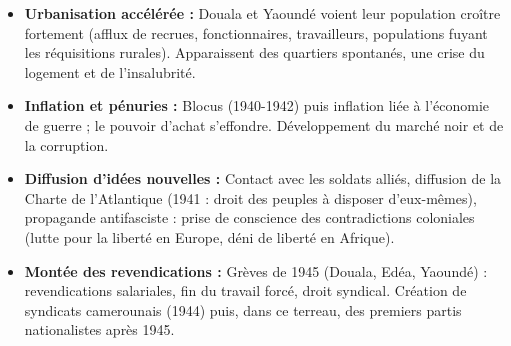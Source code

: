 \documentclass[11pt]{article}
\newcommand{\cle}[1]{{\popxbold\color{popdark}#1}}
\begin{document}
\begin{propriete}
\begin{itemize}
    \item \textbf{Urbanisation accélérée :} Douala et Yaoundé voient leur population croître fortement (afflux de recrues, fonctionnaires, travailleurs, populations fuyant les réquisitions rurales). Apparaissent des quartiers spontanés, une crise du logement et de l'insalubrité.
    \item \textbf{Inflation et pénuries :} Blocus (1940-1942) puis inflation liée à l'économie de guerre ; le pouvoir d'achat s'effondre. Développement du marché noir et de la corruption.
    \item \textbf{Diffusion d'idées nouvelles :} Contact avec les soldats alliés, diffusion de la \cle{Charte de l'Atlantique} (1941 : droit des peuples à disposer d'eux-mêmes), propagande antifasciste : prise de conscience des contradictions coloniales (lutte pour la liberté en Europe, déni de liberté en Afrique).
    \item \textbf{Montée des revendications :} Grèves de 1945 (Douala, Edéa, Yaoundé) : revendications salariales, fin du travail forcé, droit syndical. Création de syndicats camerounais (1944) puis, dans ce terreau, des premiers partis nationalistes après 1945.
\end{itemize}
\end{propriete}
\end{document}
